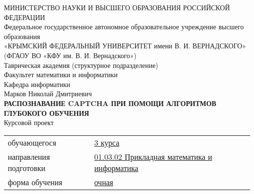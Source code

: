 \begin{center}
\small
МИНИСТЕРСТВО НАУКИ И ВЫСШЕГО ОБРАЗОВАНИЯ РОССИЙСКОЙ ФЕДЕРАЦИИ\\
{\normalsize Федеральное государственное автономное образовательное учреждение высшего образования}\\
«КРЫМСКИЙ ФЕДЕРАЛЬНЫЙ УНИВЕРСИТЕТ имени В. И. ВЕРНАДСКОГО»\\
(ФГАОУ ВО «КФУ им. В. И. Вернадского»)\\
\normalsize
Таврическая академия (структурное подразделение)\\
Факультет математики и информатики\\
Кафедра информатики\\
\vspace*{2\baselineskip}
Марков Николай Дмитриевич\\
\vspace*{1\baselineskip}
\textbf{РАСПОЗНАВАНИЕ CAPTCHA ПРИ ПОМОЩИ АЛГОРИТМОВ ГЛУБОКОГО ОБУЧЕНИЯ}\\
\vspace*{2\baselineskip}
Курсовой проект\\
\vspace*{1\baselineskip}
\end{center}

 
\begin{tabular}{m{12em} m{10em}}
	обучающегося & \underline{3 курса}\\
	направления подготовки &\underline{01.03.02 Прикладная математика и информатика}\\
	форма обучения &\underline{очная}\\
\end{tabular}\\

